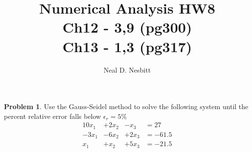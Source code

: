 \documentclass{article}
\title{Numerical Analysis HW8\\
Ch12 - 3,9 (pg300)\\
Ch13 - 1,3 (pg317)\\}
\author{Neal D. Nesbitt}
\begin{document}
\maketitle

\theoremstyle{definition}
\newtheorem{problem}{Problem}
\newtheorem{solution}{Solution}[problem]


\setcounter{problem}{2}
\begin{problem}
Use the Gauss-Seidel method to solve the following system until the percent relative error falls below $\epsilon_{r}= 5\%$\\
\[
\begin{matrix}
10x_{1}	&+2x_{2}	&-x_{3}	&=	27\\
-3x_{1}	&-6x_{2}	&+2x_{3}	&=	-61.5\\
x_{1}	&+x_{2}	&+5x_{3}	&=	-21.5
\end{matrix}
\]
\end{problem}
\end{document}
